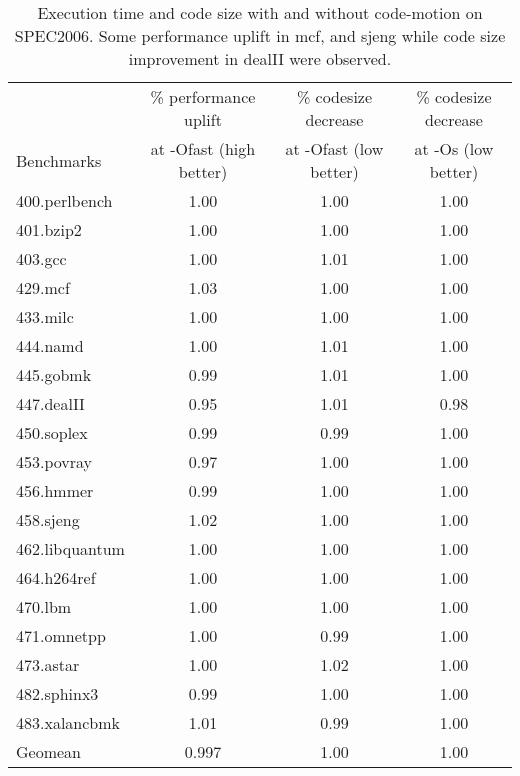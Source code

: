 \documentclass[acmlarge,review,anonymous]{acmart}\settopmatter{printfolios=true}
\begin{document}
\begin{table}[h!]
  \begin{center}
    \begin{tabular}{|l|c|c|c|}
      \hline
                &\% performance uplift & \% codesize decrease & \% codesize decrease\\
Benchmarks      & at -Ofast (high better)& at -Ofast (low better) & at -Os (low better)\\\hline
400.perlbench	& 1.00  & 1.00 & 1.00\\\hline
401.bzip2	& 1.00  & 1.00 & 1.00\\\hline
403.gcc	        & 1.00  & 1.01 & 1.00\\\hline
429.mcf	        & 1.03  & 1.00 & 1.00\\\hline
433.milc	& 1.00  & 1.00 & 1.00\\\hline
444.namd	& 1.00  & 1.01 & 1.00\\\hline
445.gobmk	& 0.99  & 1.01 & 1.00\\\hline
447.dealII	& 0.95  & 1.01 & 0.98\\\hline
450.soplex	& 0.99  & 0.99 & 1.00\\\hline
453.povray	& 0.97  & 1.00 & 1.00\\\hline
456.hmmer	& 0.99  & 1.00 & 1.00\\\hline
458.sjeng	& 1.02  & 1.00 & 1.00\\\hline
462.libquantum	& 1.00  & 1.00 & 1.00\\\hline
464.h264ref	& 1.00  & 1.00 & 1.00\\\hline
470.lbm	        & 1.00  & 1.00 & 1.00\\\hline
471.omnetpp	& 1.00  & 0.99 & 1.00\\\hline
473.astar	& 1.00  & 1.02 & 1.00\\\hline
482.sphinx3	& 0.99  & 1.00 & 1.00\\\hline
483.xalancbmk	& 1.01  & 0.99 & 1.00\\\hline
Geomean         & 0.997 & 1.00 & 1.00\\\hline
    \end{tabular}
  \end{center}
  \caption{Execution time and code size with and without code-motion on SPEC2006. Some performance uplift in mcf, and sjeng
  while code size improvement in dealII were observed.}
  \label{tab:code-size}
\end{table}
\end{document}
